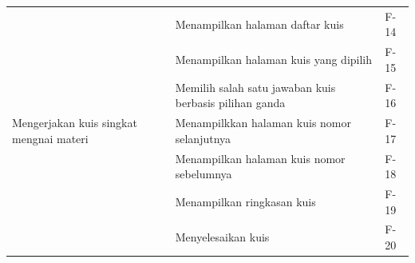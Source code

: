 \begin{table}[H]
\begin{tabular}{|m{3cm}|p{}|m{1cm}|}
		\hline
		\multirow{7}{2.5cm}{Mengerjakan kuis singkat mengnai materi} &Menampilkan halaman daftar kuis& F-14 \\
		\cline{2-3}
		&Menampilkan halaman kuis yang dipilih& F-15 \\
		\cline{2-3}
		&Memilih salah satu jawaban kuis berbasis pilihan ganda& F-16 \\
		\cline{2-3}
		&Menampilkkan halaman kuis nomor selanjutnya& F-17 \\
		\cline{2-3}
		&Menampilkan halaman kuis nomor sebelumnya& F-18 \\
		\cline{2-3}
		&Menampilkan ringkasan kuis& F-19 \\
		\cline{2-3}
		&Menyelesaikan kuis& F-20 \\
		\hline
	\end{tabular}
\end{table}

